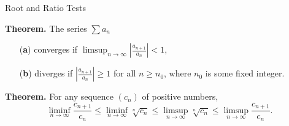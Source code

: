 \documentclass{beamer}
\begin{document}
\begin{frame}{Root and Ratio Tests}

\textbf{Theorem.} The series $\sum a_n$
\begin{enumerate}
    \item[(\textbf{a})] converges if $\limsup_{n \to \infty} \left|
    \frac{a_{n+1}}{a_n} \right| < 1$,
    \item[(\textbf{b})] diverges if $\left| \frac{a_{n+1}}{a_n} \right| \geq 1$
    for all $n \geq n_0$, where $n_0$ is some fixed integer.
\end{enumerate}

\textbf{Theorem.} For any sequence $(c_n)$ of positive numbers,
\[
\liminf_{n \to \infty} \frac{c_{n+1}}{c_n} \leq \liminf_{n \to \infty} \sqrt[n]{c_n} \leq \limsup_{n \to \infty} \sqrt[n]{c_n} \leq \limsup_{n \to \infty} \frac{c_{n+1}}{c_n}.
\]


\end{frame}
\end{document}
